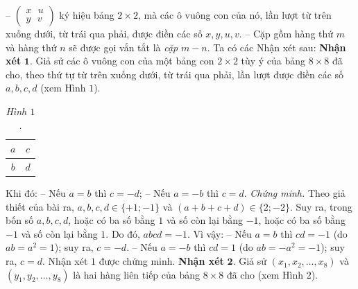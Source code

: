 \begin{multicols}{2}
	\vskip 0.05cm
	-- $\left(\!\!\! \begin{array}{l}
		x\,\,\,\, u\\
		y\,\,\,\, v
	\end{array}\!\!\! \right)$  ký hiệu bảng $2 \times  2$, mà các ô vuông con của nó, lần lượt từ trên xuống dưới, từ trái qua phải, được điền các số $x, y, u, v$.
	\vskip 0.05cm
	-- Cặp gồm hàng thứ $m$ và hàng thứ $n$ sẽ được gọi vắn tắt là \textit{cặp} $m - n$.
	\vskip 0.05cm
	Ta có các Nhận xét sau:
	\vskip 0.05cm
	\textbf{\color{thachthuctoanhoc}Nhận xét} $\pmb{1.}$ Giả sử các ô vuông con của một bảng con $2 \times  2$ tùy ý của bảng $8 \times  8$ đã cho, theo thứ tự từ trên xuống dưới, từ trái qua phải, lần lượt được điền các số $a, b, c, d$ (xem Hình $1$).
	\begin{table}[H]
		\vspace*{-10pt}
		\centering
		\captionsetup{labelformat= empty, justification=centering}
		\renewcommand{\arraystretch}{1.2}
		\setlength{\tabcolsep}{7pt}
			\begin{tabular}{|c|c|}
				\hline
				$a$ & $c$\\
				\hline
				$b$ & $d$\\
				\hline
			\end{tabular}
		\caption{\small\textit{\color{thachthuctoanhoc}Hình $1$.}}
		\vspace*{-10pt}
	\end{table}
	Khi đó:
	\vskip 0.05cm
	-- Nếu $a = b$ thì $c = -d$;
	\vskip 0.05cm
	-- Nếu $a = -b$ thì $c = d$.
	\vskip 0.05cm
	\textit{Chứng minh.} Theo giả thiết của bài ra, $a, b, c, d \in  \{+1; -1\}$ và $(a + b + c + d) \in  \{2; -2\}$. Suy ra, trong bốn số $a,b,c,d$, hoặc có ba số bằng $1$ và số còn lại bằng $-1$, hoặc có ba số bằng $-1$ và số còn lại bằng $1$. Do đó, $abcd = -1$. Vì vậy:
	\vskip 0.05cm
	-- Nếu $a = b$ thì $cd = -1$ (do $ab = {a^2} = 1$); suy ra, $c = -d$.
	\vskip 0.05cm
	-- Nếu $a = -b$ thì $cd = 1$ (do $ab =  - {a^2} =  - 1$); suy ra, $c = d$.
	\vskip 0.05cm
	Nhận xét $1$ được chứng minh.
	\vskip 0.05cm
	\textbf{\color{thachthuctoanhoc}Nhận xét} $\pmb{2.}$ Giả sử $\left( {{x_1},{x_2}, \ldots ,{x_8}} \right)$ và $\left( {{y_1},{y_2}, \ldots ,{y_8}} \right)$ là hai hàng liên tiếp của bảng $8 \times  8$ đã cho (xem Hình $2$).
	\begin{table}[H]
		\vspace*{-10pt}
		\centering
		\captionsetup{labelformat= empty, justification=centering}
		\renewcommand{\arraystretch}{1.2}
		\setlength{\tabcolsep}{7pt}
		\begin{tabular}{|c|c|c|c|c|c|c|c|c|}

\end{tabular}
\end{table}
\end{multicols}
